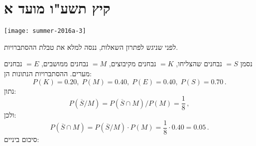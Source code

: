 \section{קיץ תשע"ו מועד א}

\begin{center}
\texttt{[image: summer-2016a-3]}
\end{center}

\vspace{-2ex}

לפני שניגש לפתרון השאלות, ננסה למלא את טבלת ההסתברויות.

נסמן 
$=S$
נבחנים שהצליחו,
$=K$
נבחנים מקיבוצים,
$=M$
נבחנים ממושבים,
$=E$
נבחנים מערים. ההסתברויות הנתונות הן:
\[
P(K)=0.20,\;P(M)=0.40,\;P(E)=0.40,\;P(S)=0.70\,.
\]
נתון:
\[
P(\overline{S}/M)=P(\overline{S}\cap M) / P(M)=\frac{1}{8}\,,
\]
ולכן:
\[
P(\overline{S}\cap M)=P(\overline{S}/M)\cdot P(M)=\frac{1}{8}\cdot 0.40=0.05\,.
\]
סיכום ביניים:
\begin{center}
\end{center}

